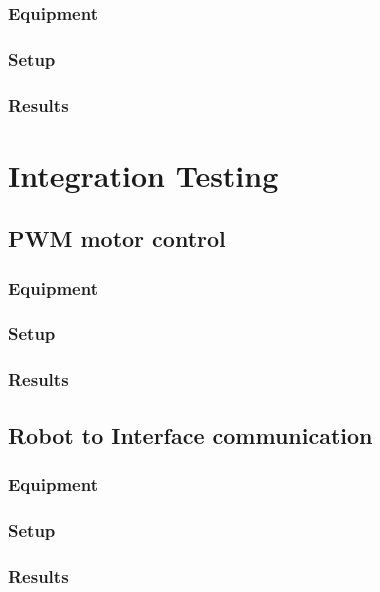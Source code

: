 \subsubsection{Equipment}
 
\subsubsection{Setup}
 
\subsubsection{Results}
 
\section{Integration Testing}

\subsection{PWM motor control}
 
\subsubsection{Equipment}
 
\subsubsection{Setup}
 
\subsubsection{Results}
 
\subsection{Robot to Interface communication}

\subsubsection{Equipment}

\subsubsection{Setup}
 
\subsubsection{Results}
 
